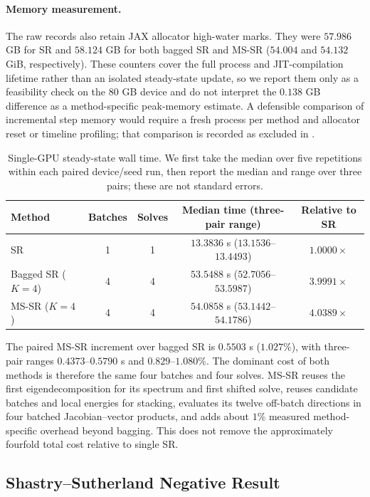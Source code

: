 \paragraph{Memory measurement.}
The raw records also retain JAX allocator high-water marks. They were
$57.986$ GB for SR and $58.124$ GB for both bagged SR and MS-SR
($54.004$ and $54.132$ GiB, respectively). These counters cover the full
process and JIT-compilation lifetime rather than an isolated steady-state
update, so we report them only as a feasibility check on the 80 GB device and
do not interpret the $0.138$ GB difference as a method-specific peak-memory
estimate. A defensible comparison of incremental step memory would require a
fresh process per method and allocator reset or timeline profiling; that
comparison is recorded as excluded in
.

\begin{table}[h]
\centering
\small
\begin{tabular}{lcccc}
\toprule
Method & Batches & Solves & Median time (three-pair range) & Relative to SR \\
\midrule
SR & 1 & 1 & $13.3836$ s ($13.1536$--$13.4493$) & $1.0000\times$ \\
Bagged SR ($K=4$) & 4 & 4 & $53.5488$ s ($52.7056$--$53.5987$) & $3.9991\times$ \\
MS-SR ($K=4$) & 4 & 4 & $54.0858$ s ($53.1442$--$54.1786$) & $4.0389\times$ \\
\bottomrule
\end{tabular}
\caption{Single-GPU steady-state wall time. We first take the median over five
repetitions within each paired device/seed run, then report the median and range
over three pairs; these are not standard errors.}
\label{tab:mssr_wallclock}
\end{table}

The paired MS-SR increment over bagged SR is $0.5503$ s ($1.027\%$), with
three-pair ranges $0.4373$--$0.5790$ s and $0.829$--$1.080\%$. The dominant
cost of both methods is therefore the same four batches and four solves. MS-SR
reuses the first eigendecomposition for its spectrum and first shifted solve,
reuses candidate batches and local energies for stacking, evaluates its twelve
off-batch directions in four batched Jacobian--vector products, and adds about
$1\%$ measured method-specific overhead beyond bagging. This does not remove
the approximately fourfold total cost relative to single SR.

\subsection{Shastry--Sutherland Negative Result}\label{app:ssm_negative}

